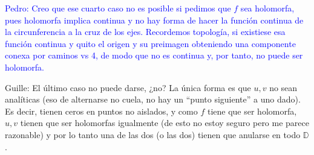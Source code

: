 \begin{problem}[1]
\textcolor{blue}{Pedro: Creo que ese cuarto caso no es posible si pedimos que $f$ sea holomorfa, pues holomorfa implica continua y no hay forma de hacer la función continua de la circunferencia a la cruz de los ejes. Recordemos topología, si existiese esa función continua y quito el origen y su preimagen obteniendo una componente conexa por caminos vs 4, de modo que no es continua y, por tanto, no puede ser holomorfa.}

\textcolor{OliveGreen}{Guille: El último caso no puede darse, ¿no? La única forma es que $u,v$ no sean analíticas (eso de alternarse no cuela, no hay un ``punto siguiente'' a uno dado). Es decir, tienen ceros en puntos no aislados, y como $f$ tiene que ser holomorfa, $u,v$ tienen que ser holomorfas igualmente (de esto no estoy seguro pero me parece razonable) y por lo tanto una de las dos (o las dos) tienen que anularse en todo $\mathbb{D}$.}

\end{problem}

